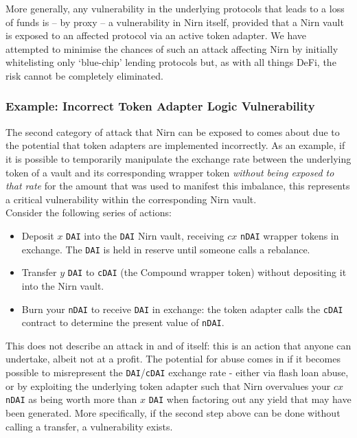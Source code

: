 \documentclass{article}
\begin{document}
\noindent
More generally, any vulnerability in the underlying protocols that leads to a loss of funds is -- by proxy -- a vulnerability in Nirn itself, provided that a Nirn vault is exposed to an affected protocol via an active token adapter. We have attempted to minimise the chances of such an attack affecting Nirn by initially whitelisting only `blue-chip' lending protocols but, as with all things DeFi, the risk cannot be completely eliminated.

\subsubsection*{Example: Incorrect Token Adapter Logic Vulnerability}

\noindent
The second category of attack that Nirn can be exposed to comes about due to the potential that token adapters are implemented incorrectly. As an example, if it is possible to temporarily manipulate the exchange rate between the underlying token of a vault and its corresponding wrapper token \textit{without being exposed to that rate} for the amount that was used to manifest this imbalance, this represents a critical vulnerability within the corresponding Nirn vault.\\

\newpage
\noindent
Consider the following series of actions:

\begin{itemize}
    \item Deposit $x$ \texttt{DAI} into the \texttt{DAI} Nirn vault, receiving $cx$ \texttt{nDAI} wrapper tokens in exchange. The \texttt{DAI} is held in reserve until someone calls a rebalance.
    \item Transfer $y$ \texttt{DAI} to \texttt{cDAI} (the Compound wrapper token) without depositing it into the Nirn vault.
    \item Burn your \texttt{nDAI} to receive \texttt{DAI} in exchange: the token adapter calls the \texttt{cDAI} contract to determine the present value of \texttt{nDAI}.
\end{itemize}

\noindent
This does not describe an attack in and of itself: this is an action that anyone can undertake, albeit not at a profit. The potential for abuse comes in if it becomes possible to misrepresent the \texttt{DAI}/\texttt{cDAI} exchange rate - either via flash loan abuse, or by exploiting the underlying token adapter such that Nirn overvalues your $cx$ \texttt{nDAI} as being worth more than $x$ \texttt{DAI} when factoring out any yield that may have been generated. More specifically, if the second step above can be done without calling a transfer, a vulnerability exists.\\
\end{document}
